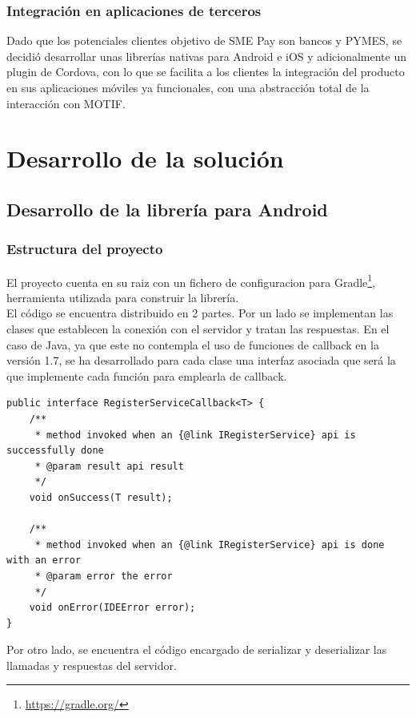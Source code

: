 \documentclass[a4paper, 12pt]{article}
\newenvironment{code}{\captionsetup{type=listing}}{}
\begin{document}
\subsubsection{Integración en aplicaciones de terceros}
\label{sec-3-2-2}
Dado que los potenciales clientes objetivo de SME Pay son bancos y PYMES, se decidió desarrollar unas librerías nativas para Android e iOS y adicionalmente un plugin de Cordova, con lo que se facilita
a los clientes la integración del producto en sus aplicaciones móviles ya funcionales, con una abstracción total de la interacción con MOTIF.
\section{Desarrollo de la solución}
\label{sec-4}
\subsection{Desarrollo de la librería para Android}
\label{sec-4-1}
\subsubsection{Estructura del proyecto}
\label{sec-4-1-1}
El proyecto cuenta en su raiz con un fichero de configuracion para Gradle\footnote{\url{https://gradle.org/}}, herramienta utilizada para construir la librería.
\\
El código se encuentra distribuido en 2 partes. Por un lado se implementan las clases que establecen la conexión con el servidor y tratan las respuestas. En el caso de Java, ya que este no contempla
el uso de funciones de callback en la versión 1.7, se ha desarrollado para cada clase una interfaz asociada que será la que implemente cada función para emplearla de callback.
\bigbreak
\begin{code}
\label{code:androidcallback}
\begin{verbatim}
public interface RegisterServiceCallback<T> {
    /**
     * method invoked when an {@link IRegisterService} api is successfully done
     * @param result api result
     */
    void onSuccess(T result);

    /**
     * method invoked when an {@link IRegisterService} api is done with an error
     * @param error the error
     */
    void onError(IDEError error);
}
\end{verbatim}
\end{code}
\bigbreak
Por otro lado, se encuentra el código encargado de serializar y deserializar las llamadas y respuestas del servidor.
\end{document}
